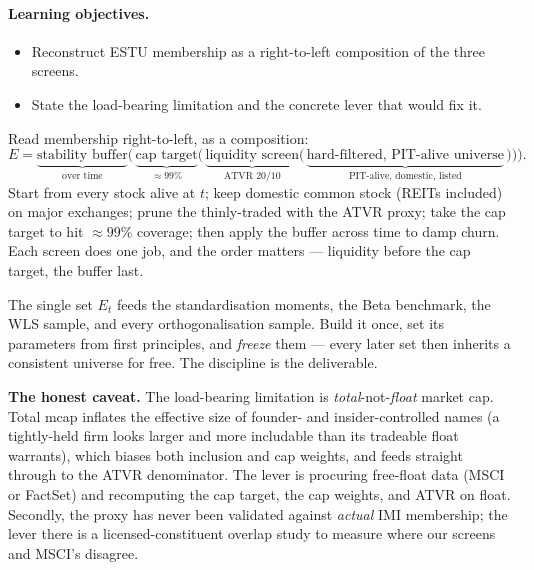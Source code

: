 \documentclass[11pt]{article}
\theoremstyle{definition}
\theoremstyle{plain}
\theoremstyle{remark}
\begin{document}
\paragraph{Learning objectives.}
\begin{itemize}[nosep,leftmargin=1.4em]
  \item Reconstruct ESTU membership as a right-to-left composition of the three screens.
  \item State the load-bearing limitation and the concrete lever that would fix it.
\end{itemize}

\begin{intuition}
Read membership right-to-left, as a composition:
\[
E = \underbrace{\text{stability buffer}}_{\text{over time}}\Big(\,\underbrace{\text{cap target}}_{\approx 99\%}\big(\,\underbrace{\text{liquidity screen}}_{\text{ATVR }20/10}\big(\,\underbrace{\text{hard-filtered, PIT-alive universe}}_{\text{PIT-alive, domestic, listed}}\,\big)\big)\Big).
\]
Start from every stock alive at $t$; keep domestic common stock (REITs included) on major exchanges; prune the thinly-traded with the ATVR proxy; take the cap target to hit $\approx 99\%$ coverage; then apply the buffer across time to damp churn. Each screen does one job, and the order matters --- liquidity before the cap target, the buffer last.
\end{intuition}

\begin{keyresult}
The single set $E_t$ feeds the standardisation moments, the Beta benchmark, the WLS sample, and every orthogonalisation sample. Build it once, set its parameters from first principles, and \emph{freeze} them --- every later set then inherits a consistent universe for free. The discipline is the deliverable.
\end{keyresult}

\begin{pitfall}
\textbf{The honest caveat.} The load-bearing limitation is \emph{total}-not-\emph{float} market cap. Total mcap inflates the effective size of founder- and insider-controlled names (a tightly-held firm looks larger and more includable than its tradeable float warrants), which biases both inclusion and cap weights, and feeds straight through to the ATVR denominator. The lever is procuring free-float data (MSCI or FactSet) and recomputing the cap target, the cap weights, and ATVR on float. Secondly, the proxy has never been validated against \emph{actual} IMI membership; the lever there is a licensed-constituent overlap study to measure where our screens and MSCI's disagree.
\end{pitfall}
\end{document}
